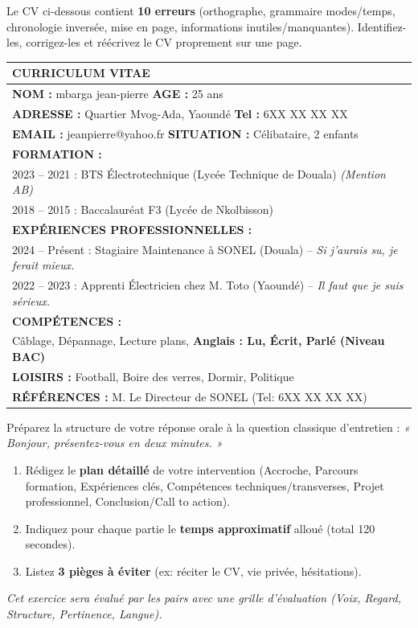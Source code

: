 \documentclass[11pt]{article}
\begin{document}
\begin{exercice}
Le CV ci-dessous contient \textbf{10 erreurs} (orthographe, grammaire modes/temps, chronologie inversée, mise en page, informations inutiles/manquantes). Identifiez-les, corrigez-les et réécrivez le CV proprement sur une page.

\begin{center}
\begin{tabularx}{\linewidth}{|X|}
\hline
\textbf{CURRICULUM VITAE} \\
\hline
\textbf{NOM :} mbarga jean-pierre \quad \textbf{AGE :} 25 ans \\
\textbf{ADRESSE :} Quartier Mvog-Ada, Yaoundé \quad \textbf{Tel :} 6XX XX XX XX \\
\textbf{EMAIL :} jeanpierre@yahoo.fr \quad \textbf{SITUATION :} Célibataire, 2 enfants \\
\hline
\textbf{FORMATION :} \\
2023 -- 2021 : BTS Électrotechnique (Lycée Technique de Douala) \textit{(Mention AB)} \\
2018 -- 2015 : Baccalauréat F3 (Lycée de Nkolbisson) \\
\hline
\textbf{EXPÉRIENCES PROFESSIONNELLES :} \\
2024 -- Présent : Stagiaire Maintenance à SONEL (Douala) -- \textit{Si j'aurais su, je ferait mieux.} \\
2022 -- 2023 : Apprenti Électricien chez M. Toto (Yaoundé) -- \textit{Il faut que je suis sérieux.} \\
\hline
\textbf{COMPÉTENCES :} \\
Câblage, Dépannage, Lecture plans, \textbf{Anglais : Lu, Écrit, Parlé (Niveau BAC)} \\
\textbf{LOISIRS :} Football, Boire des verres, Dormir, Politique \\
\hline
\textbf{RÉFÉRENCES :} M. Le Directeur de SONEL (Tel: 6XX XX XX XX) \\
\hline
\end{tabularx}
\end{center}
\end{exercice}

\begin{exercice}
Préparez la structure de votre réponse orale à la question classique d'entretien : \emph{« Bonjour, présentez-vous en deux minutes. »}
\begin{enumerate}
    \item Rédigez le \textbf{plan détaillé} de votre intervention (Accroche, Parcours formation, Expériences clés, Compétences techniques/transverses, Projet professionnel, Conclusion/Call to action).
    \item Indiquez pour chaque partie le \textbf{temps approximatif} alloué (total 120 secondes).
    \item Listez \textbf{3 pièges à éviter} (ex: réciter le CV, vie privée, hésitations).
\end{enumerate}
\textit{Cet exercice sera évalué par les pairs avec une grille d'évaluation (Voix, Regard, Structure, Pertinence, Langue).}
\end{exercice}
\end{document}
